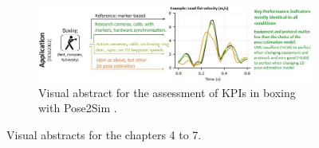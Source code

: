 \begin{figure}[hbtp]
      \vskip 1cm
	\begin{subfigure}[b]{1\textwidth}
            \centering
            \def\svgwidth{1\columnwidth}
            \fontsize{10pt}{10pt}\selectfont
            \includegraphics[width=\linewidth]{"../Intro/Figures/Fig_VisAbstract4.JPG"}
            \caption{Visual abstract for the assessment of KPIs in boxing with Pose2Sim \cite{Pagnon2022c}.}
            \label{fig_visabstract4_1}
	\end{subfigure}
	\caption{Visual abstracts for the chapters 4 to 7.}
	\label{fig_visabstract}
\end{figure}


